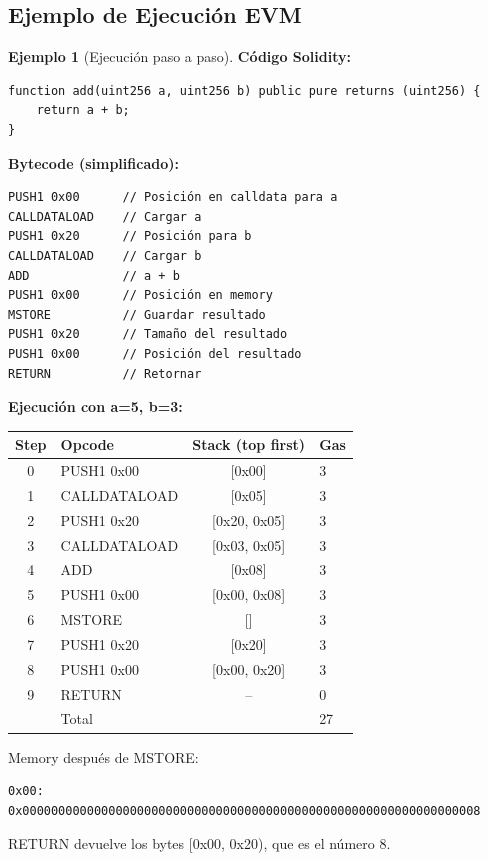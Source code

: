 \documentclass[11pt,a4paper,twoside,openright]{book}
\theoremstyle{definition}
\newtheorem{example}{Ejemplo}[chapter]
\theoremstyle{plain}
\theoremstyle{remark}
\begin{document}
\subsection{Ejemplo de Ejecución EVM}

\begin{example}[Ejecución paso a paso]
\textbf{Código Solidity:}
\begin{verbatim}
function add(uint256 a, uint256 b) public pure returns (uint256) {
    return a + b;
}
\end{verbatim}

\textbf{Bytecode (simplificado):}
\begin{verbatim}
PUSH1 0x00      // Posición en calldata para a
CALLDATALOAD    // Cargar a
PUSH1 0x20      // Posición para b
CALLDATALOAD    // Cargar b
ADD             // a + b
PUSH1 0x00      // Posición en memory
MSTORE          // Guardar resultado
PUSH1 0x20      // Tamaño del resultado
PUSH1 0x00      // Posición del resultado
RETURN          // Retornar
\end{verbatim}

\textbf{Ejecución con a=5, b=3:}

\begin{center}
\begin{tabular}{clcl}
\toprule
\textbf{Step} & \textbf{Opcode} & \textbf{Stack (top first)} & \textbf{Gas} \\
\midrule
0 & PUSH1 0x00 & [0x00] & 3 \\
1 & CALLDATALOAD & [0x05] & 3 \\
2 & PUSH1 0x20 & [0x20, 0x05] & 3 \\
3 & CALLDATALOAD & [0x03, 0x05] & 3 \\
4 & ADD & [0x08] & 3 \\
5 & PUSH1 0x00 & [0x00, 0x08] & 3 \\
6 & MSTORE & [] & 3 \\
7 & PUSH1 0x20 & [0x20] & 3 \\
8 & PUSH1 0x00 & [0x00, 0x20] & 3 \\
9 & RETURN & -- & 0 \\
\midrule
& Total & & 27 \\
\bottomrule
\end{tabular}
\end{center}

Memory después de MSTORE:
\begin{verbatim}
0x00: 0x0000000000000000000000000000000000000000000000000000000000000008
\end{verbatim}

RETURN devuelve los bytes [0x00, 0x20), que es el número 8.
\end{example}
\end{document}
